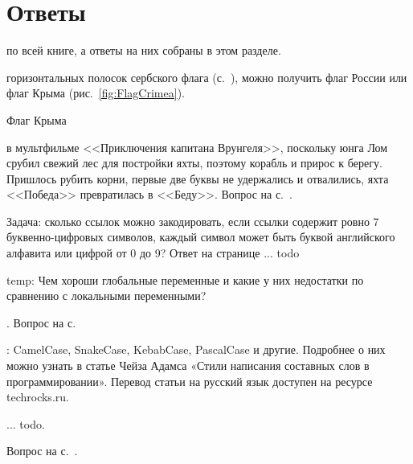 \chapter{Ответы}
\label{ch:answers}


 по всей книге, а ответы на них собраны в этом разделе.

\begin{task}
    \label{answer:Tricolor-flags}
     горизонтальных полосок 
    сербского флага (с.~\pageref{fig:Srpska}), можно получить флаг России 
    или флаг Крыма (рис.~\ref{fig:FlagCrimea}). 
\end{task}

\begin{marginfigure}[0cm]
{%
\setlength{\fboxsep}{0pt}%
\setlength{\fboxrule}{1pt}%
%
}%
\caption{Флаг Крыма}
\label{fig:FlagCrimea}
\end{marginfigure}

\begin{task}
    \label{answer:Pobeda-beda}
     в мультфильме <<Приключения капитана 
    Врунгеля>>, поскольку юнга Лом срубил свежий лес для постройки яхты, поэтому корабль 
    и прирос к берегу. Пришлось рубить корни, первые две буквы не удержались и отвалились, 
    яхта <<Победа>> превратилась в <<Беду>>. 
    \small{Вопрос на с.~\pageref{fig:Pobeda-beda}.}
\end{task}

Задача: сколько ссылок можно закодировать, если ссылки содержит ровно 7 буквенно-цифровых символов,
     каждый символ может быть буквой английского алфавита 
     или цифрой от 0 до 9? Ответ на странице ... todo 

temp: Чем хороши глобальные переменные и какие у них недостатки
по сравнению с локальными переменными?

\begin{task}
    \label{answer:guess_numbers_task}
    . 
    \small{Вопрос на с.~\pageref{question:text}}
\end{task}

\begin{task}
    \label{answer:naming}
    : CamelCase, SnakeCase, KebabCase, PascalCase и другие.
    Подробнее о них можно узнать в статье Чейза Адамса «Стили написания составных слов в программировании»\cite{CaseTypes}.
    Перевод статьи на русский язык доступен на ресурсе techrocks.ru\cite{CaseTypesRu}.
\end{task}

\begin{task}
    \label{answer:global-vars-pros-cons}
     ... todo. 

    \small{Вопрос на с.~\pageref{fig:block:proc:swap:colors}.}
\end{task}

